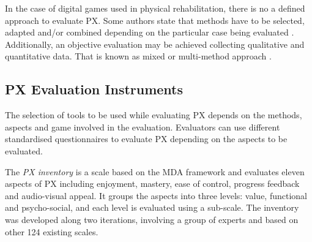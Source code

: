 
In the case of digital games used in physical rehabilitation, there is no a defined approach to evaluate \ac{PX}. Some authors state that methods have to be selected, adapted and/or combined depending on the particular case being evaluated \autocite{Yanez-Gomez2017,Wiemeyer2016,Mueller2015}. Additionally, an objective evaluation may be achieved collecting qualitative and quantitative data. That is known as mixed or multi-method approach \autocite{Nacke2009,Iacovides2015,Drachen2013,Mueller2015,Zammitto2014}.

\subsection{\ac{PX} Evaluation Instruments}
\label{subsec:instruments}
The selection of tools to be used while evaluating \ac{PX} depends on the methods, aspects and game involved in the evaluation. Evaluators can use different standardised questionnaires to evaluate PX depending on the aspects to be evaluated.

The \textit{PX inventory} \autocite{VandenAbeele2016} is a scale based on the \ac{MDA} framework and evaluates eleven aspects of \ac{PX} including enjoyment, mastery, ease of control, progress feedback and audio-visual appeal. It groups the aspects into three levels: value, functional and psycho-social, and each level is evaluated using a sub-scale. The inventory was developed along two iterations, involving a group of experts and based on other 124 existing scales. 


